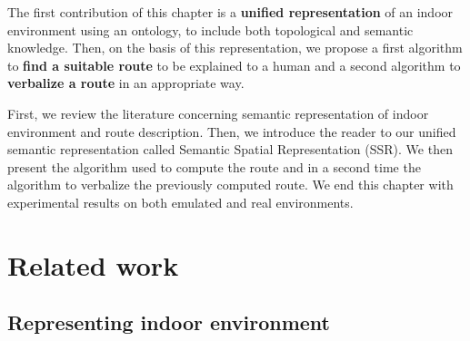 The first contribution of this chapter is a \textbf{unified representation} of an indoor environment using an ontology, to include both topological and semantic knowledge. Then, on the basis of this representation, we propose a first algorithm to \textbf{find a suitable route} to be explained to a human and a second algorithm to \textbf{verbalize a route} in an appropriate way.

First, we review the literature concerning semantic representation of indoor environment and route description. Then, we introduce the reader to our unified semantic representation called Semantic Spatial Representation (SSR). We then present the algorithm used to compute the route and in a second time the algorithm to verbalize the previously computed route. We end this chapter with experimental results on both emulated and real environments.

\section{Related work}

\subsection{Representing indoor environment}



